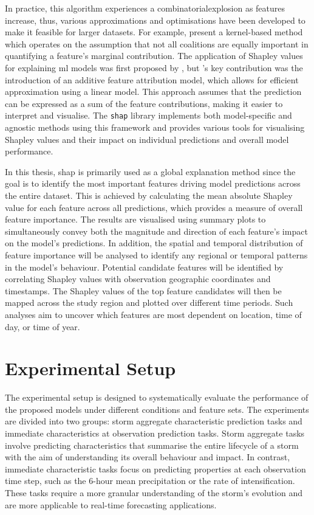 In practice, this algorithm experiences a \gls{combinatorialexplosion} as features increase, thus, various approximations and optimisations have been developed to make it feasible for larger datasets. For example, \cite{Lundberg2017} present a kernel-based method which operates on the assumption that not all coalitions are equally important in quantifying a feature's marginal contribution. The application of Shapley values for explaining \acrshort{ml} models was first proposed by \cite{trumbelj2011}, but \cite{Lundberg2017}'s key contribution was the introduction of an additive feature attribution model, which allows for efficient approximation using a linear model. This approach assumes that the prediction can be expressed as a sum of the feature contributions, making it easier to interpret and visualise. The \texttt{shap} library implements both model-specific and agnostic methods using this framework and provides various tools for visualising Shapley values and their impact on individual predictions and overall model performance.

In this thesis, \acrshort{shap} is primarily used as a global explanation method since the goal is to identify the most important features driving model predictions across the entire dataset. This is achieved by calculating the mean absolute Shapley value for each feature across all predictions, which provides a measure of overall feature importance. The results are visualised using summary plots to simultaneously convey both the magnitude and direction of each feature's impact on the model's predictions. In addition, the spatial and temporal distribution of feature importance will be analysed to identify any regional or temporal patterns in the model's behaviour. Potential candidate features will be identified by correlating Shapley values with observation geographic coordinates and timestamps. The Shapley values of the top feature candidates will then be mapped across the study region and plotted over different time periods. Such analyses aim to uncover which features are most dependent on location, time of day, or time of year.

\section{Experimental Setup}
\label{sec:experimental-setup}

The experimental setup is designed to systematically evaluate the performance of the proposed models under different conditions and feature sets. The experiments are divided into two groups: storm aggregate characteristic prediction tasks and immediate characteristics at observation prediction tasks. Storm aggregate tasks involve predicting characteristics that summarise the entire lifecycle of a storm with the aim of understanding its overall behaviour and impact. In contrast, immediate characteristic tasks focus on predicting properties at each observation time step, such as the 6-hour mean precipitation or the rate of intensification. These tasks require a more granular understanding of the storm's evolution and are more applicable to real-time forecasting applications.

